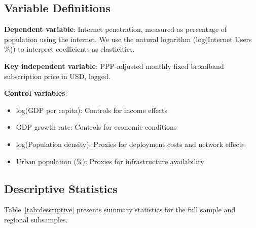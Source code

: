 \documentclass[12pt,review]{elsarticle}
\begin{document}
\subsection{Variable Definitions}

\textbf{Dependent variable}: Internet penetration, measured as percentage of population using the internet. We use the natural logarithm (log(Internet Users \%)) to interpret coefficients as elasticities.

\textbf{Key independent variable}: PPP-adjusted monthly fixed broadband subscription price in USD, logged.

\textbf{Control variables}:
\begin{itemize}
\item log(GDP per capita): Controls for income effects
\item GDP growth rate: Controls for economic conditions
\item log(Population density): Proxies for deployment costs and network effects
\item Urban population (\%): Proxies for infrastructure availability
\end{itemize}

\subsection{Descriptive Statistics}

Table~\ref{tab:descriptive} presents summary statistics for the full sample and regional subsamples.
\end{document}
